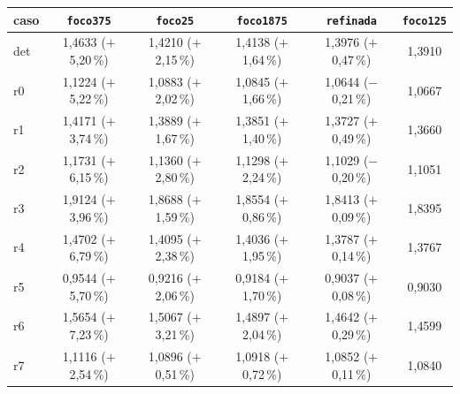 \begin{tabular}{@{}lccccc@{}}
\toprule
caso & \texttt{foco375} & \texttt{foco25} & \texttt{foco1875} & \texttt{refinada} & \texttt{foco125} \\
\midrule
det & 1{,}4633 ($+$5{,}20\,\%) & 1{,}4210 ($+$2{,}15\,\%) & 1{,}4138 ($+$1{,}64\,\%) & 1{,}3976 ($+$0{,}47\,\%) & 1{,}3910 \\
r0 & 1{,}1224 ($+$5{,}22\,\%) & 1{,}0883 ($+$2{,}02\,\%) & 1{,}0845 ($+$1{,}66\,\%) & 1{,}0644 ($-$0{,}21\,\%) & 1{,}0667 \\
r1 & 1{,}4171 ($+$3{,}74\,\%) & 1{,}3889 ($+$1{,}67\,\%) & 1{,}3851 ($+$1{,}40\,\%) & 1{,}3727 ($+$0{,}49\,\%) & 1{,}3660 \\
r2 & 1{,}1731 ($+$6{,}15\,\%) & 1{,}1360 ($+$2{,}80\,\%) & 1{,}1298 ($+$2{,}24\,\%) & 1{,}1029 ($-$0{,}20\,\%) & 1{,}1051 \\
r3 & 1{,}9124 ($+$3{,}96\,\%) & 1{,}8688 ($+$1{,}59\,\%) & 1{,}8554 ($+$0{,}86\,\%) & 1{,}8413 ($+$0{,}09\,\%) & 1{,}8395 \\
r4 & 1{,}4702 ($+$6{,}79\,\%) & 1{,}4095 ($+$2{,}38\,\%) & 1{,}4036 ($+$1{,}95\,\%) & 1{,}3787 ($+$0{,}14\,\%) & 1{,}3767 \\
r5 & 0{,}9544 ($+$5{,}70\,\%) & 0{,}9216 ($+$2{,}06\,\%) & 0{,}9184 ($+$1{,}70\,\%) & 0{,}9037 ($+$0{,}08\,\%) & 0{,}9030 \\
r6 & 1{,}5654 ($+$7{,}23\,\%) & 1{,}5067 ($+$3{,}21\,\%) & 1{,}4897 ($+$2{,}04\,\%) & 1{,}4642 ($+$0{,}29\,\%) & 1{,}4599 \\
r7 & 1{,}1116 ($+$2{,}54\,\%) & 1{,}0896 ($+$0{,}51\,\%) & 1{,}0918 ($+$0{,}72\,\%) & 1{,}0852 ($+$0{,}11\,\%) & 1{,}0840 \\
\bottomrule
\end{tabular}
